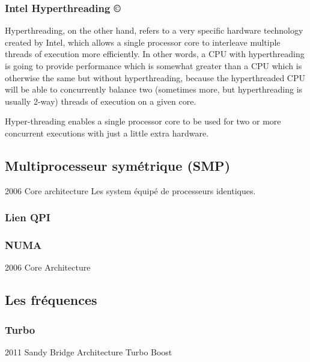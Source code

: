 \subsubsection{Intel Hyperthreading \copyright}

Hyperthreading, on the other hand, refers to a very specific hardware technology created by Intel, which allows a single processor core to interleave multiple threads of execution more efficiently. In other words, a CPU with hyperthreading is going to provide performance which is somewhat greater than a CPU which is otherwise the same but without hyperthreading, because the hyperthreaded CPU will be able to concurrently balance two (sometimes more, but hyperthreading is usually 2-way) threads of execution on a given core.

Hyper-threading enables a single processor core to be used for two or more concurrent executions with just a little extra hardware.

 

\subsection{Multiprocesseur symétrique (SMP) }
2006 Core architecture
Les system équipé de processeurs identiques.

\subsubsection{Lien QPI}
\subsubsection{NUMA}
2006 Core Architecture



\subsection{Les fréquences}
\subsubsection{Turbo}
2011 Sandy Bridge Architecture
	Turbo Boost

